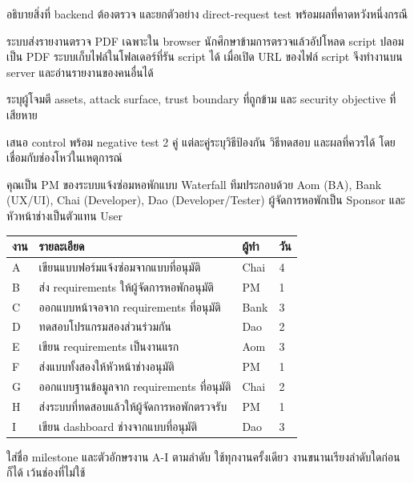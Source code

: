 อธิบายสิ่งที่ backend ต้องตรวจ และยกตัวอย่าง direct-request test พร้อมผลที่คาดหวังหนึ่งกรณี\par
\blankbox{2.5cm}
\medskip
{}
ระบบส่งรายงานตรวจ PDF เฉพาะใน browser นักศึกษาข้ามการตรวจแล้วอัปโหลด script ปลอมเป็น PDF ระบบเก็บไฟล์ในโฟลเดอร์ที่รัน script ได้ เมื่อเปิด URL ของไฟล์ script จึงทำงานบน server และอ่านรายงานของคนอื่นได้\par
{}
ระบุผู้โจมตี assets, attack surface, trust boundary ที่ถูกข้าม และ security objective ที่เสียหาย\par
\blankbox{3cm}
เสนอ control พร้อม negative test 2 คู่ แต่ละคู่ระบุวิธีป้องกัน วิธีทดสอบ และผลที่ควรได้ โดยเชื่อมกับช่องโหว่ในเหตุการณ์\par
\blankbox{4cm}
\newpage
{}
คุณเป็น PM ของระบบแจ้งซ่อมหอพักแบบ Waterfall ทีมประกอบด้วย Aom (BA), Bank (UX/UI), Chai (Developer), Dao (Developer/Tester) ผู้จัดการหอพักเป็น Sponsor และหัวหน้าช่างเป็นตัวแทน User\par
{\renewcommand{\arraystretch}{1.05}
\begin{tabularx}{\linewidth}{|M{.85cm}|Y|>{\raggedright\arraybackslash}m{1.6cm}|M{1.1cm}|}\hline
งาน & รายละเอียด & ผู้ทำ & วัน\\\hline
A & เขียนแบบฟอร์มแจ้งซ่อมจากแบบที่อนุมัติ & Chai & 4\\\hline
B & ส่ง requirements ให้ผู้จัดการหอพักอนุมัติ & PM & 1\\\hline
C & ออกแบบหน้าจอจาก requirements ที่อนุมัติ & Bank & 3\\\hline
D & ทดสอบโปรแกรมสองส่วนร่วมกัน & Dao & 2\\\hline
E & เขียน requirements เป็นงานแรก & Aom & 3\\\hline
F & ส่งแบบทั้งสองให้หัวหน้าช่างอนุมัติ & PM & 1\\\hline
G & ออกแบบฐานข้อมูลจาก requirements ที่อนุมัติ & Chai & 2\\\hline
H & ส่งระบบที่ทดสอบแล้วให้ผู้จัดการหอพักตรวจรับ & PM & 1\\\hline
I & เขียน dashboard ช่างจากแบบที่อนุมัติ & Dao & 3\\\hline
\end{tabularx}\par}
ใส่ชื่อ milestone และตัวอักษรงาน A-I ตามลำดับ ใช้ทุกงานครั้งเดียว งานขนานเรียงลำดับใดก่อนก็ได้ เว้นช่องที่ไม่ใช้\par
